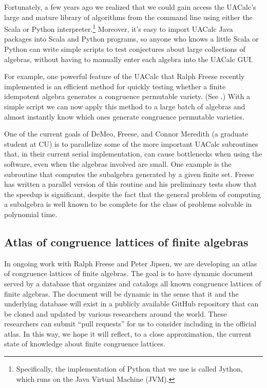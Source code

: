 \documentclass[11pt]{amsart}  %
\begin{document}
Fortunately, a few years ago we realized that we could gain access the UACalc's
large and mature library of algorithms from the command line using either the 
Scala or Python interpreter.\footnote{Specifically, the implementation of Python that we 
use is called Jython, which runs on the Java Virtual
Machine (JVM).} Moreover, it's easy to import  UACalc Java packages
into Scala and Python programs, so anyone who knows a little Scala or Python 
can write simple scripts to test conjectures about large collections of
algebras, without having to manually enter each algebra into the UACalc
GUI.

For example, one powerful feature of the UACalc that Ralph Freese recently
implemented is an efficient method for quickly testing whether a finite
idempotent algebra generates a congruence permutable variety.  (See
\cite[Theorem 5.1]{Freese:2009}.)  With a simple script we can now apply
this method to a large batch of algebras and almost instantly know which ones
generate congruence permutable varieties.

One of the current goals of DeMeo, Freese, and Connor Meredith 
(a graduate student at CU) is to parallelize some of the more
important UACalc subroutines that, in their current serial implementation, can
cause bottlenecks when using the software, even when the 
algebras involved are small.  One example is the subroutine that 
computes the subalgebra generated by a given finite set.  Freese has written a 
parallel version of this routine and his preliminary tests show that the 
speedup is significant, despite the fact that the general problem of computing 
a subalgebra is well known to be complete for the class of problems solvable in 
polynomial time.

\subsection{Atlas of congruence lattices of finite algebras}
\label{sec:atlas-congr-latt}

In ongoing work with Ralph Freese and Peter Jipsen, we are developing an
atlas of congruence lattices of finite algebras. The goal is to have dynamic
document served by a database that organizes and catalogs all known congruence
lattices of finite algebras. The document will be dynamic in the sense that it
and the underlying database will exist in a publicly available GitHub repository
that can be cloned and updated by various researchers around the world.  These
researchers can submit ``pull requests'' for us to consider including in the
official atlas.  In this way, we hope it will reflect, to a close approximation,
the current state of knowledge about finite congruence lattices.  
\end{document}
